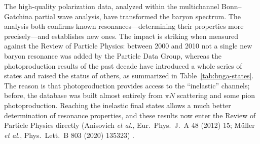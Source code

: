 The high-quality polarization data, analyzed within the multichannel Bonn--Gatchina
partial wave analysis, have transformed the baryon spectrum. The analysis both confirms
known resonances---determining their properties more precisely---and establishes new ones.
The impact is striking when measured against the Review of Particle Physics: between 2000
and 2010 not a single new baryon resonance was added by the Particle Data Group, whereas
the photoproduction results of the past decade have introduced a whole series of states
and raised the status of others, as summarized in Table~\ref{tab:bnga-states}. The reason
is that photoproduction provides access to the ``inelastic'' channels; before, the
database was built almost entirely from $\pi N$ scattering and some pion photoproduction.
Reaching the inelastic final states allows a much better determination of resonance
properties, and these results now enter the Review of Particle Physics directly
(Anisovich \textit{et al.}, Eur.\ Phys.\ J.\ A 48 (2012) 15; Müller \textit{et al.},
Phys.\ Lett.\ B 803 (2020) 135323) \cite[Ch.~15]{Amsler2018}.

